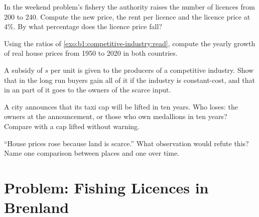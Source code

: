 \begin{exercise}[$\star\star$]\label{exo:b1:competitive-industry:more-licences}
In the weekend problem's fishery the authority raises the number of
licences from 200 to 240. Compute the new price, the rent per licence and
the licence price at $4\%$. By what percentage does the licence price fall?
\end{exercise}

\begin{exercise}[$\star\star$]\label{exo:b1:competitive-industry:growth}
Using the ratios of \cref{exo:b1:competitive-industry:read}, compute the
yearly growth of real house prices from 1950 to 2020 in both countries.
\end{exercise}

\begin{exercise}[$\star\star\star$]\label{exo:b1:competitive-industry:subsidy}
A subsidy of $s$ per unit is given to the producers of a competitive
industry. Show that in the long run buyers gain all of it if the industry
is constant-cost, and that in an  part of it goes
to the owners of the scarce input.
\end{exercise}

\begin{exercise}[$\star\star\star$]\label{exo:b1:competitive-industry:expected}
A city announces that its taxi cap will be lifted in ten years. Who loses:
the owners at the announcement, or those who own medallions in ten years?
Compare with a cap lifted without warning.
\end{exercise}

\begin{exercise}[$\star\star\star$]\label{exo:b1:competitive-industry:refute}
``House prices rose because land is scarce.'' What observation would refute
this? Name one comparison between places and one over time.
\end{exercise}

\section{Problem: Fishing Licences in Brenland}\label{sec:b1:competitive-industry:problem}

